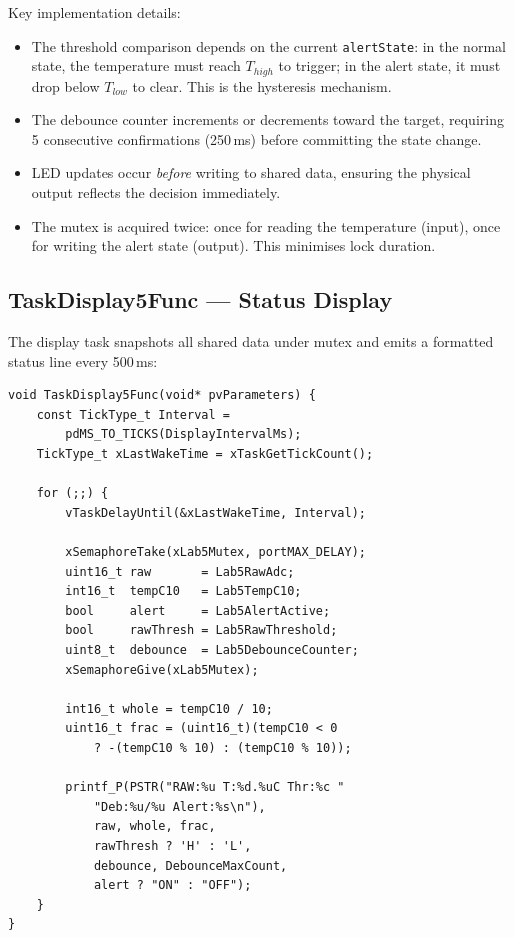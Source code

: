 \documentclass[12pt]{article}
\begin{document}
Key implementation details:
\begin{itemize}
  \item The threshold comparison depends on the current \texttt{alertState}: in the normal state, the temperature must reach \(T_{high}\) to trigger; in the alert state, it must drop below \(T_{low}\) to clear. This is the hysteresis mechanism.
  \item The debounce counter increments or decrements toward the target, requiring 5 consecutive confirmations (250\,ms) before committing the state change.
  \item LED updates occur \emph{before} writing to shared data, ensuring the physical output reflects the decision immediately.
  \item The mutex is acquired twice: once for reading the temperature (input), once for writing the alert state (output). This minimises lock duration.
\end{itemize}

\subsection{TaskDisplay5Func --- Status Display}

The display task snapshots all shared data under mutex and emits a formatted status line every 500\,ms:

\begin{lstlisting}[caption={TaskDisplay5Func --- periodic status display}]
void TaskDisplay5Func(void* pvParameters) {
    const TickType_t Interval =
        pdMS_TO_TICKS(DisplayIntervalMs);
    TickType_t xLastWakeTime = xTaskGetTickCount();

    for (;;) {
        vTaskDelayUntil(&xLastWakeTime, Interval);

        xSemaphoreTake(xLab5Mutex, portMAX_DELAY);
        uint16_t raw       = Lab5RawAdc;
        int16_t  tempC10   = Lab5TempC10;
        bool     alert     = Lab5AlertActive;
        bool     rawThresh = Lab5RawThreshold;
        uint8_t  debounce  = Lab5DebounceCounter;
        xSemaphoreGive(xLab5Mutex);

        int16_t whole = tempC10 / 10;
        uint16_t frac = (uint16_t)(tempC10 < 0
            ? -(tempC10 % 10) : (tempC10 % 10));

        printf_P(PSTR("RAW:%u T:%d.%uC Thr:%c "
            "Deb:%u/%u Alert:%s\n"),
            raw, whole, frac,
            rawThresh ? 'H' : 'L',
            debounce, DebounceMaxCount,
            alert ? "ON" : "OFF");
    }
}
\end{lstlisting}
\end{document}
